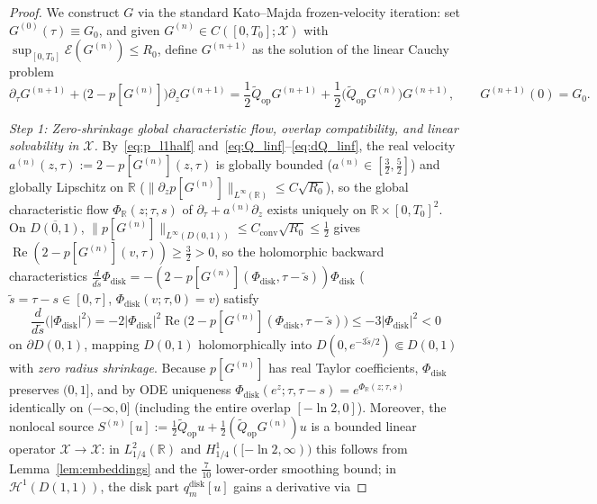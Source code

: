 \documentclass[11pt,a4paper]{article}
\begin{document}
\begin{proof}
We construct $G$ via the standard Kato--Majda frozen-velocity iteration: set $G^{(0)}(\tau)\equiv G_0$, and given
$G^{(n)}\in C([0,T_0];\mathcal{X})$ with $\sup_{[0,T_0]}\mathcal{E}(G^{(n)})\le R_0$, define $G^{(n+1)}$ as the solution of the
linear Cauchy problem
\begin{equation}\label{eq:frozen_pde}
\partial_\tau G^{(n+1)} + \bigl(2 - p[G^{(n)}]\bigr)\partial_z G^{(n+1)}
= \frac{1}{2}\widetilde{Q}_{\mathrm{op}}G^{(n+1)} + \frac{1}{2}\bigl(\widetilde{Q}_{\mathrm{op}}G^{(n)}\bigr)G^{(n+1)},
\qquad G^{(n+1)}(0) = G_0.
\end{equation}

\emph{Step 1: Zero-shrinkage global characteristic flow, overlap compatibility, and linear solvability in $\mathcal{X}$.}
By~\eqref{eq:p_l1half} and~\eqref{eq:Q_linf}--\eqref{eq:dQ_linf}, the real velocity $a^{(n)}(z,\tau):=2-p[G^{(n)}](z,\tau)$
is globally bounded ($a^{(n)}\in[\frac{3}{2},\frac{5}{2}]$) and globally Lipschitz on $\mathbb{R}$
($\|\partial_z p[G^{(n)}]\|_{L^\infty(\mathbb{R})}\le C\sqrt{R_0}$), so the global characteristic flow $\Phi_{\mathbb{R}}(z;\tau,s)$
of $\partial_\tau + a^{(n)}\partial_z$ exists uniquely on $\mathbb{R}\times[0,T_0]^2$.
On $\overline{D(0,1)}$, $\|p[G^{(n)}]\|_{L^\infty(D(0,1))}\le C_{\mathrm{conv}}\sqrt{R_0}\le\frac{1}{2}$ gives
$\operatorname{Re}(2 - p[G^{(n)}](v,\tau)) \ge \frac{3}{2} > 0$, so the holomorphic backward characteristics
$\frac{d}{d\tilde{s}}\Phi_{\mathrm{disk}} = -(2-p[G^{(n)}](\Phi_{\mathrm{disk}},\tau-\tilde{s}))\Phi_{\mathrm{disk}}$
($\tilde{s}=\tau-s\in[0,\tau]$, $\Phi_{\mathrm{disk}}(v;\tau,0)=v$) satisfy
\[
\frac{d}{d\tilde{s}}\bigl(|\Phi_{\mathrm{disk}}|^2\bigr)
= -2|\Phi_{\mathrm{disk}}|^2\operatorname{Re}\bigl(2-p[G^{(n)}](\Phi_{\mathrm{disk}},\tau-\tilde{s})\bigr)
\le -3|\Phi_{\mathrm{disk}}|^2 < 0
\]
on $\partial D(0,1)$, mapping $D(0,1)$ holomorphically into $D(0,e^{-3\tilde{s}/2})\Subset D(0,1)$ with \emph{zero radius shrinkage}.
Because $p[G^{(n)}]$ has real Taylor coefficients, $\Phi_{\mathrm{disk}}$ preserves $(0,1]$, and by ODE uniqueness
$\Phi_{\mathrm{disk}}(e^z;\tau,\tau-s)=e^{\Phi_{\mathbb{R}}(z;\tau,s)}$ identically on $(-\infty,0]$ (including the entire overlap $[-\ln 2,0]$).
Moreover, the nonlocal source $S^{(n)}[u]:=\frac{1}{2}\widetilde{Q}_{\mathrm{op}}u+\frac{1}{2}(\widetilde{Q}_{\mathrm{op}}G^{(n)})u$
is a bounded linear operator $\mathcal{X}\to\mathcal{X}$:
in $L^2_{1/4}(\mathbb{R})$ and $H^1_{1/4}([-\ln 2,\infty))$ this follows from Lemma~\ref{lem:embeddings} and the
$\frac{7}{10}$ lower-order smoothing bound; in $\mathcal{H}^1(D(1,1))$, the disk part $q_m^{\mathrm{disk}}[u]$ gains a derivative via

\end{proof}
\end{document}
